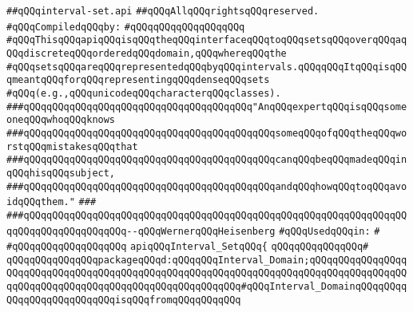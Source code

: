 \label{src/lib/src/interval-set.api}
\verb|##qQQqinterval-set.api|\newline
\verb|##qQQqAllqQQqrightsqQQqreserved.|\newline
\newline
\verb|#qQQqCompiledqQQqby:|\newline
\verb|#qQQqqQQqqQQqqQQqqQQq|\newline
\newline
\newline
\newline
\verb|#qQQqThisqQQqapiqQQqisqQQqtheqQQqinterfaceqQQqtoqQQqsetsqQQqoverqQQqaqQQqdiscreteqQQqorderedqQQqdomain,qQQqwhereqQQqthe|\newline
\verb|#qQQqsetsqQQqareqQQqrepresentedqQQqbyqQQqintervals.qQQqqQQqItqQQqisqQQqmeantqQQqforqQQqrepresentingqQQqdenseqQQqsets|\newline
\verb|#qQQq(e.g.,qQQqunicodeqQQqcharacterqQQqclasses).|\newline
\newline
\newline
\verb|###qQQqqQQqqQQqqQQqqQQqqQQqqQQqqQQqqQQqqQQq"AnqQQqexpertqQQqisqQQqsomeoneqQQqwhoqQQqknows|\newline
\verb|###qQQqqQQqqQQqqQQqqQQqqQQqqQQqqQQqqQQqqQQqqQQqsomeqQQqofqQQqtheqQQqworstqQQqmistakesqQQqthat|\newline
\verb|###qQQqqQQqqQQqqQQqqQQqqQQqqQQqqQQqqQQqqQQqqQQqcanqQQqbeqQQqmadeqQQqinqQQqhisqQQqsubject,|\newline
\verb|###qQQqqQQqqQQqqQQqqQQqqQQqqQQqqQQqqQQqqQQqqQQqandqQQqhowqQQqtoqQQqavoidqQQqthem."|\newline
\verb|###|\newline
\verb|###qQQqqQQqqQQqqQQqqQQqqQQqqQQqqQQqqQQqqQQqqQQqqQQqqQQqqQQqqQQqqQQqqQQqqQQqqQQqqQQqqQQqqQQq--qQQqWernerqQQqHeisenberg|\newline
\newline
\newline
\newline
\verb|#qQQqUsedqQQqin:|\newline
\verb|#|\newline
\verb|#qQQqqQQqqQQqqQQqqQQq|\newline
\newline
\verb|apiqQQqInterval_SetqQQq{|\newline
\verb|qQQqqQQqqQQqqQQq#|\newline
\verb|qQQqqQQqqQQqqQQqpackageqQQqd:qQQqqQQqInterval_Domain;qQQqqQQqqQQqqQQqqQQqqQQqqQQqqQQqqQQqqQQqqQQqqQQqqQQqqQQqqQQqqQQqqQQqqQQqqQQqqQQqqQQqqQQqqQQqqQQqqQQqqQQqqQQqqQQqqQQqqQQqqQQqqQQq#qQQqInterval_DomainqQQqqQQqqQQqqQQqqQQqqQQqqQQqisqQQqfromqQQqqQQqqQQq|\newline
